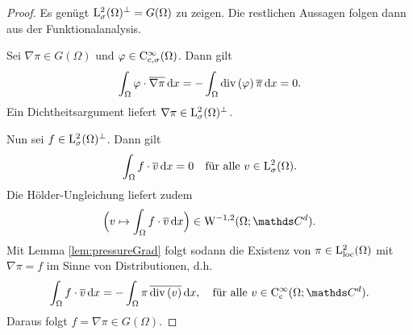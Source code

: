 \begin{proof}
  Es genügt $\mathrm{L}^2_\sigma(\Omega)^\perp = G(\Omega)$ zu zeigen.
  Die restlichen Aussagen folgen dann aus der Funktionalanalysis.
  
  Sei $\nabla\pi \in G(\Omega)$ und $\varphi \in \mathrm{C}_{\mathrm{c}, \sigma}^\infty(\Omega)$.
  Dann gilt
  $$
  \int_\Omega \varphi \cdot \overline{\nabla\pi} \, {\operatorname{d}\!{x}} = -\int_\Omega \mathrm{div\,} (\varphi) \, \overline \pi \, {\operatorname{d}\!{x}} = 0.
  $$
  Ein Dichtheitsargument liefert $\nabla \pi \in \mathrm{L}_\sigma^2(\Omega)^\perp$.

  Nun sei $f \in \mathrm{L}_\sigma^2(\Omega)^\perp$.
  Dann gilt 
  $$
  \int_\Omega f \cdot \overline v \, {\operatorname{d}\!{x}} = 0 \quad\text{für alle } v \in \mathrm{L}^2_\sigma(\Omega).
  $$
  Die Hölder-Ungleichung liefert zudem
  $$
  \Big( v \mapsto \int_\Omega f \cdot \overline v \d x \Big) \in \WW^{-1,2}(\Omega;\C^d).
  $$
  Mit Lemma \ref{lem:pressureGrad} folgt sodann die Existenz von $\pi \in \mathrm{L}^2_{\operatorname{loc}}(\Omega)$ mit $\nabla \pi = f$ im Sinne von Distributionen, d.h.
  $$
  \int_\Omega f \cdot \overline v \d x 
  = - \int_\Omega \pi \, \overline{\div(v)} \d x, \quad \text{für alle } v \in \CC_{\cc}^\infty(\Omega; \C^d).
  $$
  Daraus folgt $f = \nabla \pi \in G(\Omega)$.
\end{proof}
